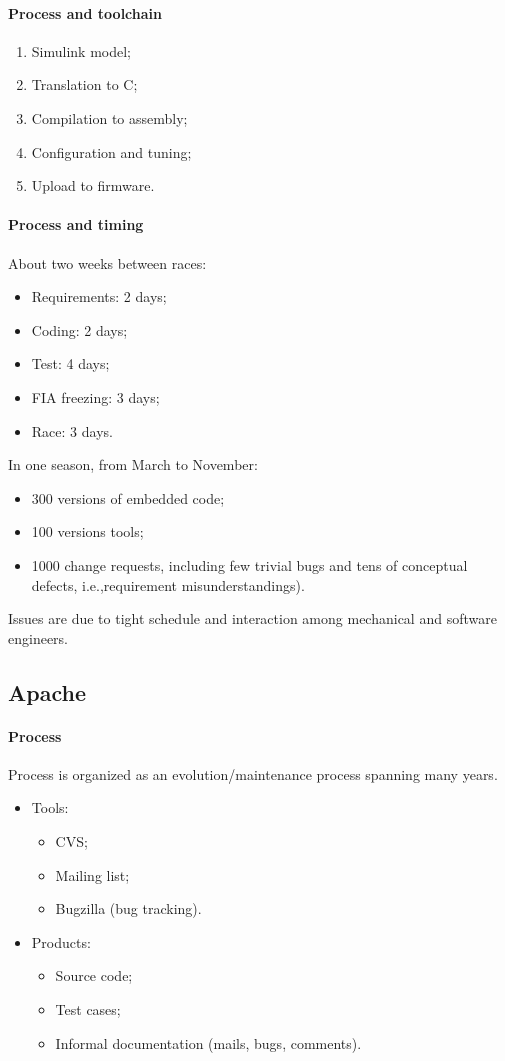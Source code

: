 \paragraph{Process and toolchain}
\begin{enumerate}
\item Simulink model;
\item Translation to C;
\item Compilation to assembly;
\item Configuration and tuning;
\item Upload to firmware.
\end{enumerate}

\paragraph{Process and timing}
About two weeks between races:
\begin{itemize}
\item Requirements: 2 days;
\item Coding: 2 days;
\item Test: 4 days;
\item FIA freezing: 3 days;
\item Race: 3 days.
\end{itemize}
In one season, from March to November:
\begin{itemize}
\item 300 versions of embedded code;
\item 100 versions tools;
\item 1000 change requests, including few trivial bugs and tens of conceptual defects, i.e.,\@ requirement misunderstandings).
\end{itemize}
Issues are due to tight schedule and interaction among mechanical and software engineers.

\subsection{Apache}
\paragraph{Process}
Process is organized as an evolution/maintenance process spanning many years.
\begin{itemize}
\item Tools:
\begin{itemize}
\item CVS;
\item Mailing list;
\item Bugzilla (bug tracking).
\end{itemize}
\item Products:
\begin{itemize}
\item Source code;
\item Test cases;
\item Informal documentation (mails, bugs, comments).
\end{itemize}
\end{itemize}

